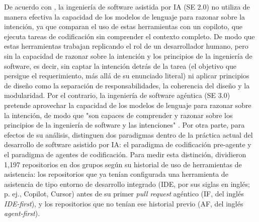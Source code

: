De acuerdo con \textcite{hassan2026se3}, la ingeniería de software asistida por IA (SE 2.0) no utiliza de manera efectiva la capacidad de los modelos de lenguaje para razonar sobre la intención, ya que comparan el uso de estas herramientas con un copiloto, que ejecuta tareas de codificación sin comprender el contexto completo. De modo que estas herramientas trabajan replicando el rol de un desarrollador humano, pero sin la capacidad de razonar sobre la intención y los principios de la ingeniería de software, es decir, sin captar la intención detrás de la tarea (el objetivo que persigue el requerimiento, más allá de su enunciado literal) ni aplicar principios de diseño como la separación de responsabilidades, la coherencia del diseño y la modularidad.
Por el contrario, la ingeniería de software agéntica (SE 3.0) pretende aprovechar la capacidad de los modelos de lenguaje para razonar sobre la intención, de modo que "son capaces de comprender y razonar sobre los principios de la ingeniería de software y las intenciones" \parencite[Abstract, traducción propia]{hassan2026se3}.
Por otra parte, para efectos de su análisis, \textcite{agarwal2026codingagents} distinguen dos paradigmas dentro de la práctica actual del desarrollo de software asistido por IA: el paradigma de codificación pre-agente y el paradigma de agentes de codificación.
Para medir esta distinción, \textcite{agarwal2026codingagents} dividieron 1,197 repositorios en dos grupos según su historial de uso de herramientas de asistencia: los repositorios que ya tenían configurada una herramienta de asistencia de tipo entorno de desarrollo integrado (IDE, por sus siglas en inglés; p. ej., Copilot, Cursor) antes de su primer \textit{pull request} agéntico (IF, del inglés \textit{IDE-first}), y los repositorios que no tenían ese historial previo (AF, del inglés \textit{agent-first}).

